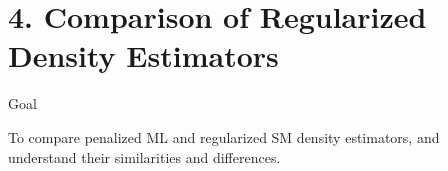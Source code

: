 \documentclass[aspectratio=169,xcolor=dvipsnames]{beamer}
\begin{document}
%	
%	


\section{4. Comparison of Regularized Density Estimators}

	
\begin{frame}{Goal}

	To compare penalized ML and regularized SM density estimators, and understand their similarities and differences. 
	
\end{frame}
\end{document}
